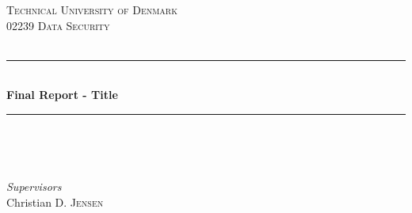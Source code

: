 \begin{titlepage}

\newcommand{\HRule}{\rule{\linewidth}{0.5mm}} %

\center %
 

\textsc{\LARGE Technical University of Denmark}\\[1.5cm] %
\textsc{\Large 02239 Data Security}\\[0.5cm] %
\textsc{\large }\\[0.5cm] %


\HRule \\[0.4cm]
{ \huge \bfseries Final Report - Title}\\[0.4cm] %
\HRule \\[1.5cm]
 

\begin{minipage}{0.4\textwidth}
\begin{flushleft} \large

\end{flushleft}
\end{minipage}
~
\begin{minipage}{0.4\textwidth}
\begin{flushright} \large
\emph{Supervisors} \\
Christian \textsc{D. Jensen} \\ %
\end{flushright}
\end{minipage}\\[2cm]



\end{titlepage}
